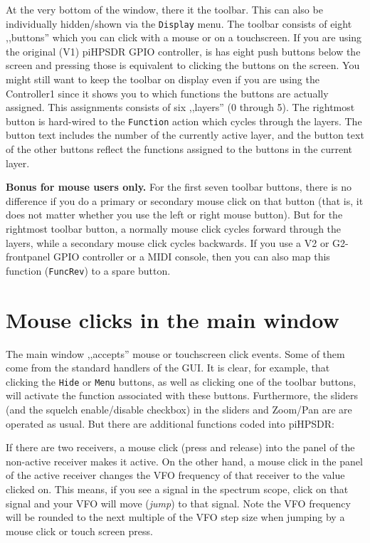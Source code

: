 \documentclass[12pt]{book}
\def\rett#1{\texttt{\color{red}#1}}
\def\bltt#1{\texttt{\color{blue}#1}}
\begin{document}
At the very bottom of the window, there it the toolbar. This can also be
individually hidden/shown via the \bltt{Display} menu. The toolbar consists
of eight ,,buttons'' which you can click with a mouse or on a touchscreen.
If you are using the original (V1) piHPSDR GPIO controller, is has eight
push buttons below the screen and pressing those is equivalent to clicking
the buttons on the screen. You might still want to keep the toolbar on display
even if you are using the Controller1 since it shows you to which functions
the buttons are actually assigned. This assignments consists of six ,,layers''
(0 through 5). The rightmost button is hard-wired to the \bltt{Function}
action which cycles through the layers. The button text includes the 
number of the currently active layer, and the button text of the other buttons
reflect the functions assigned to the buttons in the current layer. 

\textbf{Bonus for mouse users only.} For the first seven toolbar buttons,
there is no difference if you do a primary or secondary mouse click on that
button (that is, it does not matter whether you use the left or right mouse
button). But for the rightmost toolbar button, a normally mouse click cycles
forward through the layers, while a secondary mouse click cycles backwards.
If you use a V2 or G2-frontpanel GPIO controller or a MIDI console, then you
can also map this function (\bltt{FuncRev}) to a spare button.


\section{Mouse clicks in the main window}
The main window ,,accepts'' mouse or touchscreen click events.
Some of them come from the standard handlers of the GUI. It is
clear, for example, that clicking the \rett{Hide} or
\rett{Menu} buttons, as well as clicking one of the
toolbar buttons, will activate the function associated with
these buttons. Furthermore, the sliders (and the squelch enable/disable
checkbox) in the sliders and Zoom/Pan are are operated as usual.
But there are additional functions coded into piHPSDR:

If there are two receivers, a mouse click (press and release) into
the panel of the non-active receiver makes it active. On the other
hand, a mouse click in the panel of the active receiver changes
the VFO frequency of that receiver to the value clicked on.
This means, if you see a signal in the spectrum scope, click
on that signal and your VFO will move (\textit{jump}) to that signal.
Note the VFO frequency will be  rounded to the next multiple of
the VFO step size when jumping by a mouse  click or
touch screen press.
\end{document}
